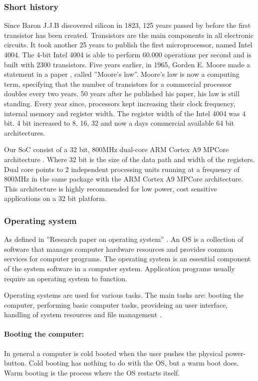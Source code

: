 \documentclass[12pt,a4paper,english,twoside,openright]{tutthesis}
\begin{document}
			\subsubsection{Short history}
Since Baron J.J.B discovered silicon in 1823, 125 years passed by before the first transistor has been created. Transistors are the main components in all electronic circuits. It took another 25 years to publish the first microprocessor, named Intel 4004. The 4-bit Intel 4004 is able to perform 60.000 operations per second and is built with 2300 transistors. Five years earlier, in 1965, Gorden E. Moore made a statement in a paper \cite{MooreLaw}, called ''Moore's law''. Moore's law is now a computing term, specifying that the number of transistors for a commercial processor doubles every two years. 50 years after he published his paper, his law is still standing. Every year since, processors kept increasing their clock frequency, internal memory and register width. The register width of the Intel 4004 was 4 bit. 4 bit increased to 8, 16, 32 and now a days commercial available 64 bit architectures.

Our SoC consist of a 32 bit, 800MHz dual-core ARM Cortex A9 MPCore architecture \cite{AlteraHPS}. Where 32 bit is the size of the data path and width of the registers. Dual core points to 2 independent processing units running at a frequency of 800MHz in the same package with the ARM Cortex A9 MPCore architecture. This architecture is highly recommended for low power, cost sensitive applications on a 32 bit platform. 
			\subsubsection{Operating system}
As defined in ''Research paper on operating system'' \cite{LinuxOS}. An OS is a collection of software that manages computer hardware resources and provides common services for computer programs. The operating system is an essential component of the system software in a computer system. Application programs usually require an operating system to function.

Operating systems are used for various tasks. The main tasks are: booting the computer, performing basic computer tasks, provideing an user interface, handling of system resources and file management \cite{LinuxOS}.
				\paragraph{Booting the computer:}
In general a computer is cold booted when the user pushes the physical power-button. Cold booting has nothing to do with the OS, but a warm boot does. Warm booting is the process where the OS restarts itself.
\end{document}
